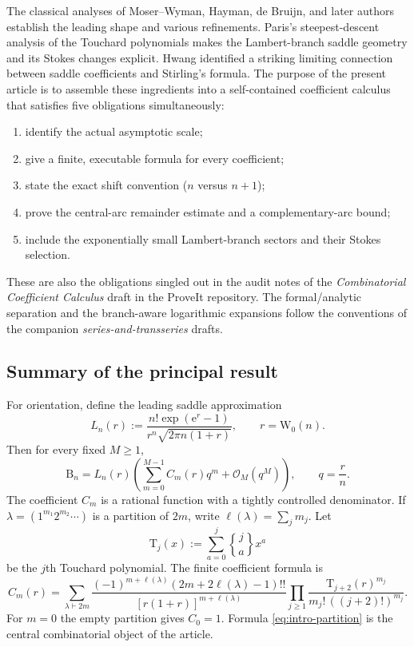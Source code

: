 \documentclass[11pt,a4paper]{article}
\theoremstyle{definition}
\newcommand{\Bell}{\mathrm B}
\newcommand{\Touch}{\mathrm T}
\newcommand{\W}{\mathrm W}
\newcommand{\ee}{\mathrm e}
\newcommand{\bigO}{\mathcal O}
\newcommand{\Stwo}[2]{\genfrac{\{}{\}}{0pt}{}{#1}{#2}}
\begin{document}
The classical analyses of Moser--Wyman, Hayman, de Bruijn, and later authors
establish the leading shape and various refinements.  Paris's steepest-descent
analysis of the Touchard polynomials makes the Lambert-branch saddle geometry
and its Stokes changes explicit.  Hwang identified a striking limiting
connection between saddle coefficients and Stirling's formula.  The purpose of
the present article is to assemble these ingredients into a self-contained
coefficient calculus that satisfies five obligations simultaneously:
\begin{enumerate}
 \item identify the actual asymptotic scale;
 \item give a finite, executable formula for every coefficient;
 \item state the exact shift convention ($n$ versus $n+1$);
 \item prove the central-arc remainder estimate and a complementary-arc bound;
 \item include the exponentially small Lambert-branch sectors and their Stokes
       selection.
\end{enumerate}
These are also the obligations singled out in the audit notes of the
\emph{Combinatorial Coefficient Calculus} draft in the ProveIt repository.  The
formal/analytic separation and the branch-aware logarithmic expansions follow
the conventions of the companion \emph{series-and-transseries} drafts.

\subsection{Summary of the principal result}

For orientation, define the leading saddle approximation
\begin{equation}\label{eq:leading-def}
 L_n(r):=
 \frac{n!\exp(\ee^r-1)}{r^n\sqrt{2\pi n(1+r)}},
 \qquad r=\W_0(n).
\end{equation}
Then for every fixed $M\ge1$,
\begin{equation}\label{eq:intro-main}
 \Bell_n=L_n(r)
 \left(\sum_{m=0}^{M-1}C_m(r)q^m+\bigO_M(q^M)\right),
 \qquad q=\frac rn.
\end{equation}
The coefficient $C_m$ is a rational function with a tightly controlled
denominator.  If $\lambda=(1^{m_1}2^{m_2}\cdots)$ is a partition of $2m$,
write $\ell(\lambda)=\sum_jm_j$.  Let
\begin{equation}\label{eq:touchard-def-intro}
 \Touch_j(x):=\sum_{a=0}^j \Stwo{j}{a}x^a
\end{equation}
be the $j$th Touchard polynomial.  The finite coefficient formula is
\begin{equation}\label{eq:intro-partition}
 \boxed{
 C_m(r)=\sum_{\lambda\vdash 2m}
 \frac{(-1)^{m+\ell(\lambda)}
       (2m+2\ell(\lambda)-1)!!}
      {[r(1+r)]^{m+\ell(\lambda)}}
 \prod_{j\ge1}
 \frac{\Touch_{j+2}(r)^{m_j}}
      {m_j!\,((j+2)!)^{m_j}}.}
\end{equation}
For $m=0$ the empty partition gives $C_0=1$.  Formula
\eqref{eq:intro-partition} is the central combinatorial object of the article.
\end{document}
